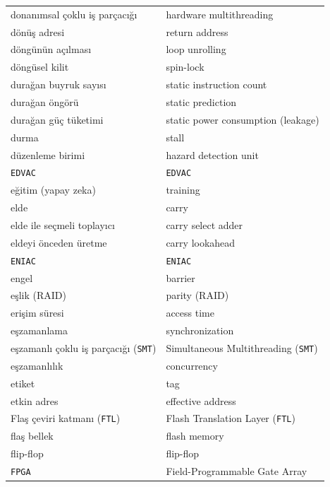 {\begin{longtable}{@{}p{7.6cm}p{7.6cm}@{}}
donanımsal çoklu iş parçacığı & hardware multithreading \\
dönüş adresi & return address \\
döngünün açılması & loop unrolling \\
döngüsel kilit & spin-lock \\
durağan buyruk sayısı & static instruction count \\
durağan öngörü & static prediction \\
durağan güç tüketimi & static power consumption (leakage) \\
durma & stall \\
düzenleme birimi & hazard detection unit \\

\texttt{EDVAC} & \texttt{EDVAC} \\
eğitim (yapay zeka) & training \\
elde & carry \\
elde ile seçmeli toplayıcı & carry select adder \\
eldeyi önceden üretme & carry lookahead \\
\texttt{ENIAC} & \texttt{ENIAC} \\
engel & barrier \\
eşlik (RAID) & parity (RAID) \\
erişim süresi & access time \\
eşzamanlama & synchronization \\
eşzamanlı çoklu iş parçacığı (\texttt{SMT}) & Simultaneous Multithreading (\texttt{SMT}) \\
eşzamanlılık & concurrency \\
etiket & tag \\
etkin adres & effective address \\

Flaş çeviri katmanı (\texttt{FTL}) & Flash Translation Layer (\texttt{FTL}) \\
flaş bellek & flash memory \\
flip-flop & flip-flop \\
\texttt{FPGA} & Field-Programmable Gate Array \\


\end{longtable}}
